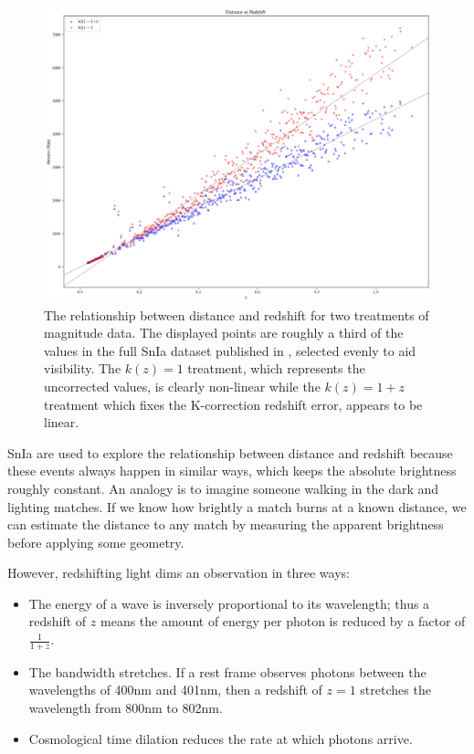 \documentclass[linenumbers]{aastex631}
\begin{document}
\begin{figure}
  \includegraphics[width=\linewidth]{mu_distance_vs_redshift.png}
  \caption{The relationship between distance and redshift for two treatments of
  magnitude data. The displayed points are roughly a third of the values in the
  full SnIa dataset published in \citet{abbott2024}, selected evenly to aid
  visibility. The $k(z) = 1$ treatment, which represents the uncorrected
  values, is clearly non-linear while the $k(z) = 1 + z$ treatment which fixes
  the K-correction redshift error, appears to be linear.}
  \label{fig:mu_distance_vs_redshift}
\end{figure}

SnIa are used to explore the relationship between distance and redshift because
these events always happen in similar ways, which keeps the absolute brightness
roughly constant. An analogy is to imagine someone walking in the dark and
lighting matches. If we know how brightly a match burns at a known distance, we
can estimate the distance to any match by measuring the apparent brightness
before applying some geometry.

However, redshifting light dims an observation in three ways:

\begin{itemize}
  \item The energy of a wave is inversely proportional to its wavelength; thus a
  redshift of $z$ means the amount of energy per photon is reduced by a factor
  of $\frac{1}{1+z}$.

  \item The bandwidth stretches. If a rest frame observes photons
  between the wavelengths of 400nm and 401nm, then a redshift of $z = 1$
  stretches the wavelength from 800nm to 802nm.

  \item Cosmological time dilation reduces the rate at which photons arrive.
\end{itemize}
\end{document}
